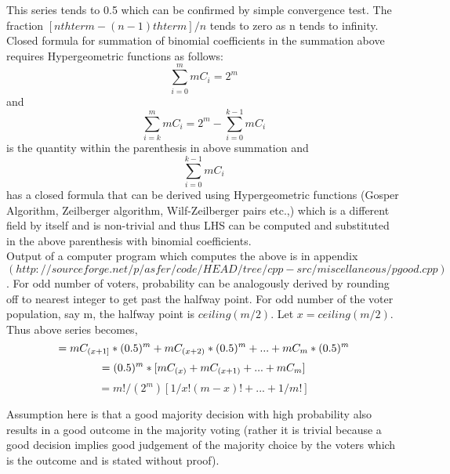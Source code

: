 \documentclass[11pt,onecolumn]{article}
\begin{document}
This series tends to 0.5 which can be confirmed by simple convergence test. The fraction $[nthterm  - (n-1)thterm] / n$  tends to zero as n tends to infinity. Closed formula for summation of binomial coefficients in the summation above requires Hypergeometric functions as follows:
\begin{equation}
\sum_{i=0}^{m} mC_{i} = 2^{m} 
\end{equation}
and 
\begin{equation}
\sum_{i=k}^{m} mC_{i} = 2^{m} - \sum_{i=0}^{k-1} mC_{i}  
\end{equation}
is the quantity within the parenthesis in above summation and  
\begin{equation} 
\sum_{i=0}^{k-1} mC_{i}  
\end{equation}
has a closed formula that can be derived using Hypergeometric functions (Gosper Algorithm, Zeilberger 
algorithm, Wilf-Zeilberger pairs etc.,) which is a different field by itself and is non-trivial and thus LHS can be computed and substituted  in the above parenthesis with binomial coefficients. \\ 

Output of a computer program which computes the above is in appendix \\ $(http://sourceforge.net/p/asfer/code/HEAD/tree/cpp-src/miscellaneous/pgood.cpp)$.
For odd number of voters, probability can be analogously derived by rounding off to nearest integer to get past the halfway point. For odd number of the voter population, say m, the halfway
point is $ceiling(m/2)$. Let $x=ceiling(m/2)$. Thus above series becomes,
\begin{equation}
= mC_{(x+1]} * (0.5)^{m} + mC_{(x+2)} * (0.5)^{m} + ... + mC_{m} * (0.5)^{m} \\
\end{equation}
\begin{equation}
= (0.5)^m * [ mC_{(x)} + mC_{(x+1)} + ... + mC_{m} ] \\
\end{equation}
\begin{equation}
= m!/(2^m) [ 1/x!(m-x)! + ... + 1/m! ]
\end{equation}


Assumption here is that a good majority decision with high probability also results in a good
outcome in the majority voting (rather it is trivial because a good decision implies good judgement of the majority choice by the voters which is the outcome and is stated without proof).
\end{document}
